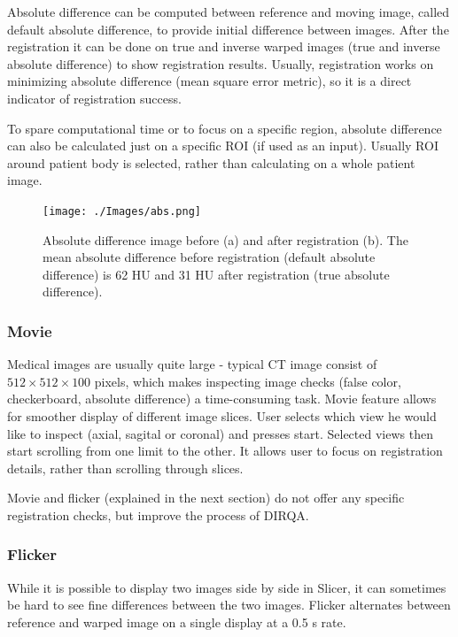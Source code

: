 \documentclass[type=dr, dr=rernat, accentcolor=tud7b,colorbacktitle, bigchapter, openright, twoside, 12pt ]{tudthesis}
\begin{document}
Absolute difference can be computed between reference and moving image, called default absolute difference, to provide initial difference between images. After the registration it can be done on
true and inverse warped images (true and inverse absolute difference) to show registration results. Usually, registration works on minimizing absolute difference (mean square error metric), so it is a direct indicator
of registration success.

To spare computational time or to focus on a specific region, absolute difference can also be calculated just on a specific ROI (if used as an input). Usually ROI around patient body is selected, rather than calculating on a whole patient image.


\begin{figure}[H]
	\begin{center}		
		\texttt{[image: ./Images/abs.png]}
		\caption{Absolute difference image before (a) and after registration (b). The mean absolute difference before registration (default absolute difference) is 62 HU and 31 HU after registration (true absolute difference).}
		\label{absDiff}
	\end{center}
\end{figure}

\subsubsection{Movie}

Medical images are usually quite large - typical CT image consist of $512 \times 512 \times 100$ pixels, which makes inspecting image checks (false color, checkerboard, absolute difference) a time-consuming task. Movie feature allows for smoother display of different image slices. User selects which view he would like to inspect (axial, sagital or coronal) and presses start. Selected views then start scrolling from one limit to the other. It allows user to focus on registration details, rather than scrolling through slices.

Movie and flicker (explained in the next section) do not offer any specific registration checks, but improve the process of DIRQA.

\subsubsection{Flicker}

While it is possible to display two images side by side in Slicer, it can sometimes be hard to see fine differences between the two images. Flicker alternates between reference and warped image on a single display at a 0.5 s rate.
\end{document}
